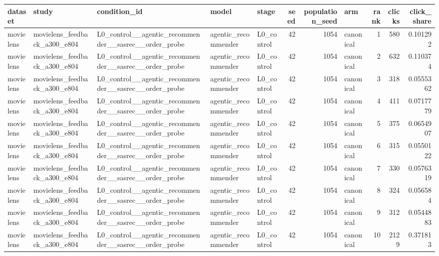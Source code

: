 \begin{table}[htbp!]
\centering
\small
\setlength{\tabcolsep}{3pt}
\renewcommand{\arraystretch}{1.1}
\begin{tabular}{lllllrrlrrr}
\hline
dataset & study & condition\_id & model & stage & seed & population\_seed & arm & rank & clicks & click\_share \\
\hline
movielens & movielens\_feedback\_a300\_e804 & L0\_control\_\_agentic\_recommender\_\_sasrec\_\_order\_probe & agentic\_recommender & L0\_control & 42 & 1054 & canonical & 1 & 580 & 0.101292 \\
movielens & movielens\_feedback\_a300\_e804 & L0\_control\_\_agentic\_recommender\_\_sasrec\_\_order\_probe & agentic\_recommender & L0\_control & 42 & 1054 & canonical & 2 & 632 & 0.110374 \\
movielens & movielens\_feedback\_a300\_e804 & L0\_control\_\_agentic\_recommender\_\_sasrec\_\_order\_probe & agentic\_recommender & L0\_control & 42 & 1054 & canonical & 3 & 318 & 0.0555362 \\
movielens & movielens\_feedback\_a300\_e804 & L0\_control\_\_agentic\_recommender\_\_sasrec\_\_order\_probe & agentic\_recommender & L0\_control & 42 & 1054 & canonical & 4 & 411 & 0.0717779 \\
movielens & movielens\_feedback\_a300\_e804 & L0\_control\_\_agentic\_recommender\_\_sasrec\_\_order\_probe & agentic\_recommender & L0\_control & 42 & 1054 & canonical & 5 & 375 & 0.0654907 \\
movielens & movielens\_feedback\_a300\_e804 & L0\_control\_\_agentic\_recommender\_\_sasrec\_\_order\_probe & agentic\_recommender & L0\_control & 42 & 1054 & canonical & 6 & 315 & 0.0550122 \\
movielens & movielens\_feedback\_a300\_e804 & L0\_control\_\_agentic\_recommender\_\_sasrec\_\_order\_probe & agentic\_recommender & L0\_control & 42 & 1054 & canonical & 7 & 330 & 0.0576319 \\
movielens & movielens\_feedback\_a300\_e804 & L0\_control\_\_agentic\_recommender\_\_sasrec\_\_order\_probe & agentic\_recommender & L0\_control & 42 & 1054 & canonical & 8 & 324 & 0.056584 \\
movielens & movielens\_feedback\_a300\_e804 & L0\_control\_\_agentic\_recommender\_\_sasrec\_\_order\_probe & agentic\_recommender & L0\_control & 42 & 1054 & canonical & 9 & 312 & 0.0544883 \\
movielens & movielens\_feedback\_a300\_e804 & L0\_control\_\_agentic\_recommender\_\_sasrec\_\_order\_probe & agentic\_recommender & L0\_control & 42 & 1054 & canonical & 10 & 2129 & 0.371813 \\

\end{tabular}
\end{table}
